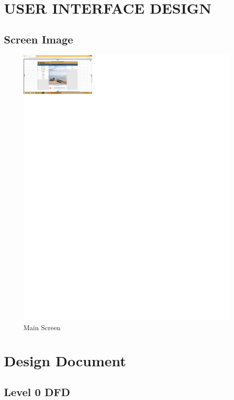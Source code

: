 \documentclass[12pt,a4paper,final,oneside]{report}
\begin{document}
\chapter{USER INTERFACE DESIGN  }
\section{  Screen Image  }
\begin{figure}[h]
\begin{center}
\includegraphics[width=1300px]{ui.png} \caption{Main Screen}
\end{center}
\end{figure}

\chapter{ Design Document  }

\section{  Level 0 DFD}
\end{document}
